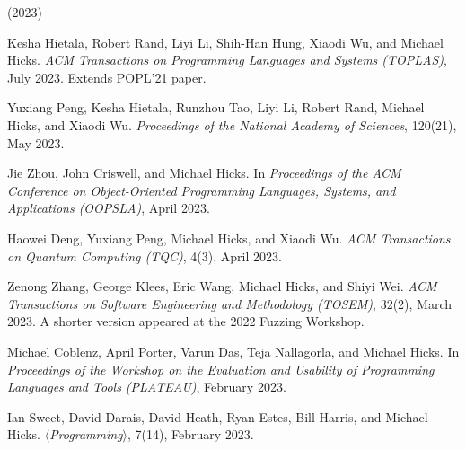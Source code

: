 \documentclass[11pt]{article}
\begin{document}
\begin{description}

\item
\item (2023)

\item
  Kesha Hietala, Robert Rand, Liyi Li, Shih-Han Hung, Xiaodi Wu, and Michael
  Hicks.
{\em {ACM} Transactions on Programming Languages and Systems
  (TOPLAS)}, July 2023.
Extends POPL'21 paper.
  
\item
Yuxiang Peng, Kesha Hietala, Runzhou Tao, Liyi Li, Robert Rand, Michael Hicks,
  and Xiaodi Wu.
{\em Proceedings of the National Academy of Sciences}, 120(21), May
  2023.
  
\item
Jie Zhou, John Criswell, and Michael Hicks.
 In {\em Proceedings of the {ACM} Conference on Object-Oriented
  Programming Languages, Systems, and Applications (OOPSLA)}, April 2023.

\item
Haowei Deng, Yuxiang Peng, Michael Hicks, and Xiaodi Wu.
{\em {ACM} Transactions on Quantum Computing (TQC)}, 4(3), April 2023.

\item
Zenong Zhang, George Klees, Eric Wang, Michael Hicks, and Shiyi Wei.
{\em {ACM} Transactions on Software Engineering and Methodology
  (TOSEM)}, 32(2), March 2023.
A shorter version appeared at the 2022 Fuzzing Workshop.

\item
Michael Coblenz, April Porter, Varun Das, Teja Nallagorla, and Michael Hicks.
In {\em Proceedings of the Workshop on the Evaluation and Usability
  of Programming Languages and Tools (PLATEAU)}, February 2023.

\item
Ian Sweet, David Darais, David Heath, Ryan Estes, Bill Harris, and Michael
  Hicks.
 {\em $\langle$Programming$\rangle$}, 7(14), February 2023.



\end{description}
\end{document}
